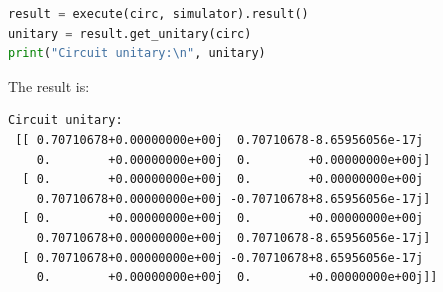 \documentclass[a4paper,num-refs]{oup-contemporary}
\begin{document}
\begin{lstlisting}[language=Python]
result = execute(circ, simulator).result()
unitary = result.get_unitary(circ)
print("Circuit unitary:\n", unitary)
\end{lstlisting}

The result is:

\begin{verbatim}
Circuit unitary:
 [[ 0.70710678+0.00000000e+00j  0.70710678-8.65956056e-17j
    0.        +0.00000000e+00j  0.        +0.00000000e+00j]
  [ 0.        +0.00000000e+00j  0.        +0.00000000e+00j
    0.70710678+0.00000000e+00j -0.70710678+8.65956056e-17j]
  [ 0.        +0.00000000e+00j  0.        +0.00000000e+00j
    0.70710678+0.00000000e+00j  0.70710678-8.65956056e-17j]
  [ 0.70710678+0.00000000e+00j -0.70710678+8.65956056e-17j
    0.        +0.00000000e+00j  0.        +0.00000000e+00j]]
\end{verbatim}
\end{document}
